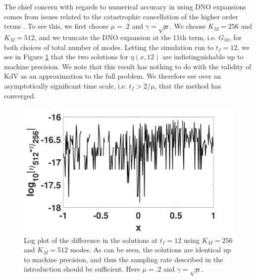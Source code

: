 \documentclass[a4paper,11pt]{article}
\begin{document}
The chief concern with regards to numerical accuracy in using DNO expansions comes from issues related to the catastrophic cancellation of the higher order terms \cite{wilkening}. To see this, we first choose $\mu=.2$ and $\gamma=\sqrt{\mu}$.  We choose $K_{M}=256$ and $K_{M}=512$, and we truncate the DNO expansion at the 11th term, i.e. $G_{10}$, for both choices of total number of modes.   Letting the simulation run to $t_{f}=12$, we see in Figure \ref{fig:convcomp} that the two solutions for $\eta(x,12)$ are indistinguishable up to machine precision.  We note that this result has nothing to do with the validity of KdV as an approximation to the full problem.  We therefore see over an asymptotically significant time scale, i.e. $t_{f} > 2/\mu$, that the method has converged.  
\begin{figure}[h]
\centering
\includegraphics[width=.48\textwidth]{conv_plot_tf_12}
\caption{Log plot of the difference in the solutions at $t_{f}=12$ using $K_{M}=256$ and $K_{M}=512$ modes.  As can be seen, the solutions are identical up to machine precision, and thus the sampling rate described in the introduction should be sufficient.  Here $\mu=.2$ and $\gamma=\sqrt{\mu}$.}
\label{fig:convcomp}
\end{figure}
\end{document}

